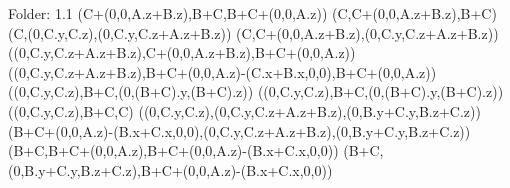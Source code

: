 Folder: 1.1
\left(C+\left(0,0,A.z+B.z\right),B+C,B+C+\left(0,0,A.z\right)\right)
\left(C,C+\left(0,0,A.z+B.z\right),B+C\right)
\left(C,\left(0,C.y,C.z\right),\left(0,C.y,C.z+A.z+B.z\right)\right)
\left(C,C+\left(0,0,A.z+B.z\right),\left(0,C.y,C.z+A.z+B.z\right)\right)
\left(\left(0,C.y,C.z+A.z+B.z\right),C+\left(0,0,A.z+B.z\right),B+C+\left(0,0,A.z\right)\right)
\left(\left(0,C.y,C.z+A.z+B.z\right),B+C+\left(0,0,A.z\right)-\left(C.x+B.x,0,0\right),B+C+\left(0,0,A.z\right)\right)
\left(\left(0,C.y,C.z\right),B+C,\left(0,\left(B+C\right).y,\left(B+C\right).z\right)\right)
\left(\left(0,C.y,C.z\right),B+C,\left(0,\left(B+C\right).y,\left(B+C\right).z\right)\right)
\left(\left(0,C.y,C.z\right),B+C,C\right)
\left(\left(0,C.y,C.z\right),\left(0,C.y,C.z+A.z+B.z\right),\left(0,B.y+C.y,B.z+C.z\right)\right)
\left(B+C+\left(0,0,A.z\right)-\left(B.x+C.x,0,0\right),\left(0,C.y,C.z+A.z+B.z\right),\left(0,B.y+C.y,B.z+C.z\right)\right)
\left(B+C,B+C+\left(0,0,A.z\right),B+C+\left(0,0,A.z\right)-\left(B.x+C.x,0,0\right)\right)
\left(B+C,\left(0,B.y+C.y,B.z+C.z\right),B+C+\left(0,0,A.z\right)-\left(B.x+C.x,0,0\right)\right)


